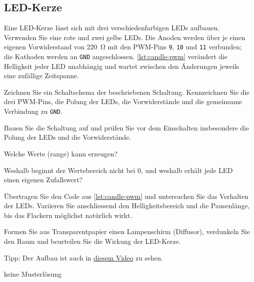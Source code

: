 

\clearpage
\subsection{LED-Kerze}

\begin{myexercise}
Eine LED-Kerze lässt sich mit drei verschiedenfarbigen LEDs aufbauen. Verwenden Sie eine rote und zwei gelbe LEDs. Die Anoden werden über je einen eigenen Vorwiderstand von \qty{220}{\ohm} mit den PWM-Pins \texttt{9}, \texttt{10} und \texttt{11} verbunden; die Kathoden werden an \texttt{GND} angeschlossen. \cref{lst:candle-pwm} verändert die Helligkeit jeder LED unabhängig und wartet zwischen den Änderungen jeweils eine zufällige Zeitspanne.

\begin{aenum}
	\item Zeichnen Sie ein Schaltschema der beschriebenen Schaltung. Kennzeichnen Sie die drei PWM-Pins, die Polung der LEDs, die Vorwiderstände und die gemeinsame Verbindung zu \texttt{GND}.
	\item Bauen Sie die Schaltung auf und prüfen Sie vor dem Einschalten insbesondere die Polung der LEDs und die Vorwiderstände.
	\item Welche Werte (range) kann  erzeugen?
	\item Weshalb beginnt der Wertebereich nicht bei $0$, und weshalb erhält jede LED einen eigenen Zufallswert?
	\item Übertragen Sie den Code aus \cref{lst:candle-pwm} und untersuchen Sie das Verhalten der LEDs. Variieren Sie anschliessend den Helligkeitsbereich und die Pausenlänge, bis das Flackern möglichst natürlich wirkt.
	\item Formen Sie aus Transparentpapier einen Lampenschirm (Diffusor), verdunkeln Sie den Raum und beurteilen Sie die Wirkung der LED-Kerze.
\end{aenum}
Tipp: Der Aufbau ist auch in \href{https://youtu.be/uX9YMCLgK9A?t=136}{diesem Video} zu sehen.
\begin{myanswer}
keine Musterlösung
\end{myanswer}
\end{myexercise}

